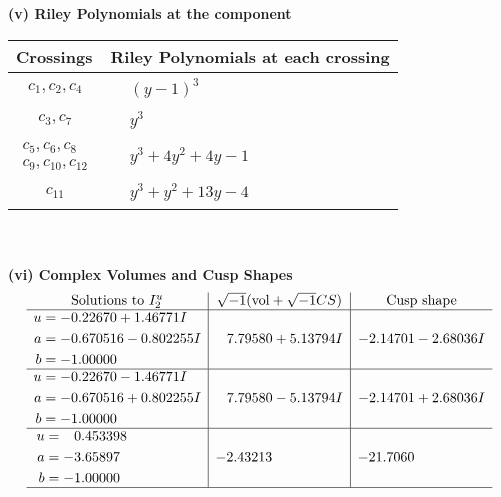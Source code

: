 \documentclass[1p]{elsarticle_modified}
\theoremstyle{definition}
\newcommand{\I}{\sqrt{-1}}
\begin{document}
\flushleft \textbf{(v) Riley Polynomials at the component}\newline \\
\begin{tabular}{m{50pt}|m{274pt}}
Crossings & \hspace{64pt}Riley Polynomials at each crossing \\
\hline $$\begin{aligned}c_{1},c_{2},c_{4}\end{aligned}$$&$\begin{aligned}
&(y-1)^3
\end{aligned}$\\
\hline $$\begin{aligned}c_{3},c_{7}\end{aligned}$$&$\begin{aligned}
&y^3
\end{aligned}$\\
\hline $$\begin{aligned}c_{5},c_{6},c_{8}\\c_{9},c_{10},c_{12}\end{aligned}$$&$\begin{aligned}
&y^3+4 y^2+4 y-1
\end{aligned}$\\
\hline $$\begin{aligned}c_{11}\end{aligned}$$&$\begin{aligned}
&y^3+y^2+13 y-4
\end{aligned}$\\
\hline
\end{tabular}\\~\\
\newpage\flushleft \textbf{(vi) Complex Volumes and Cusp Shapes}
$$\begin{array}{c|c|c}  
\text{Solutions to }I^u_{2}& \I (\text{vol} + \sqrt{-1}CS) & \text{Cusp shape}\\
 \hline 
\begin{aligned}
u &= -0.22670 + 1.46771 I \\
a &= -0.670516 - 0.802255 I \\
b &= -1.00000\phantom{ +0.000000I}\end{aligned}
 & \phantom{-}7.79580 + 5.13794 I & -2.14701 - 2.68036 I \\ \hline\begin{aligned}
u &= -0.22670 - 1.46771 I \\
a &= -0.670516 + 0.802255 I \\
b &= -1.00000\phantom{ +0.000000I}\end{aligned}
 & \phantom{-}7.79580 - 5.13794 I & -2.14701 + 2.68036 I \\ \hline\begin{aligned}
u &= \phantom{-}0.453398\phantom{ +0.000000I} \\
a &= -3.65897\phantom{ +0.000000I} \\
b &= -1.00000\phantom{ +0.000000I}\end{aligned}
 & -2.43213\phantom{ +0.000000I} & -21.7060\phantom{ +0.000000I}\\
 \hline 
 \end{array}$$\newpage\newpage\renewcommand{\arraystretch}{1}
\end{document}
